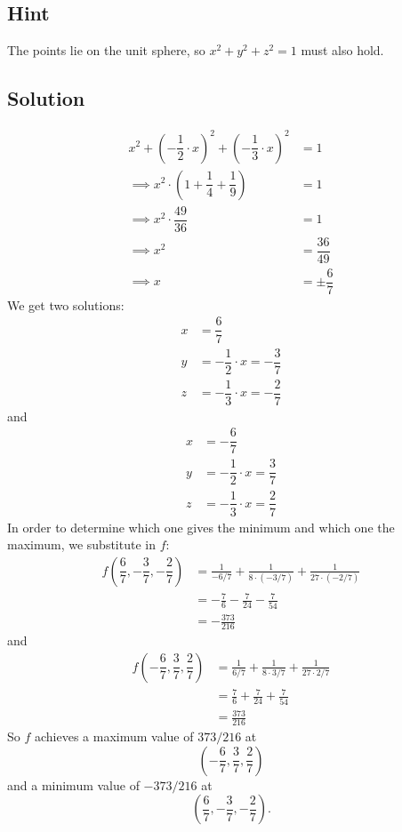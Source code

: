 \documentclass[a4paper,10pt]{article}
\begin{document}
\subsection{Hint}
The points lie on the unit sphere, so $x^2+y^2+z^2=1$ must also hold.

\subsection{Solution}
\begin{align*}
    x^2 + \left(-\dfrac{1}{2}\cdot x\right)^2 + \left(-\dfrac{1}{3}\cdot x\right)^2 & = 1                \\
    \implies x^2\cdot\left(1 + \dfrac{1}{4} + \dfrac{1}{9}\right)                   & = 1                \\
    \implies x^2\cdot \dfrac{49}{36}                                                & = 1                \\
    \implies x^2                                                                    & = \dfrac{36}{49}   \\
    \implies x                                                                      & = \pm \dfrac{6}{7}
\end{align*}
We get two solutions:
\begin{align*}
    x & = \dfrac{6}{7}                          \\
    y & = -\dfrac{1}{2} \cdot x = -\dfrac{3}{7} \\
    z & = -\dfrac{1}{3} \cdot x = -\dfrac{2}{7}
\end{align*}
and
\begin{align*}
    x & =  -\dfrac{6}{7}                       \\
    y & = -\dfrac{1}{2} \cdot x = \dfrac{3}{7} \\
    z & = -\dfrac{1}{3} \cdot x = \dfrac{2}{7}
\end{align*}
In order to determine which one gives the minimum and which one the maximum, we substitute in $f$:
\begin{align*}
    f\left(\dfrac{6}{7}, -\dfrac{3}{7}, -\dfrac{2}{7}\right) & = \frac{1}{-6/7} + \frac{1}{8\cdot(-3/7)} + \frac{1}{27\cdot (-2/7)} \\
                                                             & = -\frac{7}{6} - \frac{7}{24} - \frac{7}{54}                         \\
                                                             & = -\frac{373}{216}
\end{align*}
and
\begin{align*}
    f\left(-\dfrac{6}{7}, \dfrac{3}{7}, \dfrac{2}{7}\right) & = \frac{1}{6/7} + \frac{1}{8\cdot 3/7} + \frac{1}{27\cdot 2/7} \\
                                                            & = \frac{7}{6} + \frac{7}{24} + \frac{7}{54}                    \\
                                                            & = \frac{373}{216}
\end{align*}
So $f$ achieves a maximum value of $373/216$ at
\[
    \left(-\dfrac{6}{7}, \dfrac{3}{7}, \dfrac{2}{7}\right)
\]
and a minimum value of $-373/216$ at
\[
    \left(\dfrac{6}{7}, -\dfrac{3}{7}, -\dfrac{2}{7}\right).
\]
\end{document}

